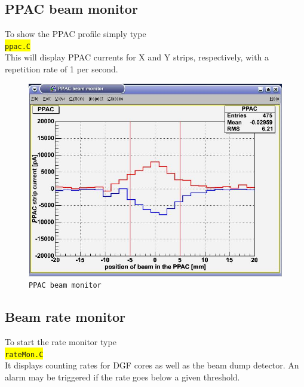 \documentclass[10pt]{article}
\newcommand{\yellow}[1]{\colorbox{yellow}{\texttt{#1}}}
\begin{document}
\subsection{PPAC beam monitor}\label{PPAC}\vspace{3mm}

To show the PPAC profile simply type\\

\hspace*{.2\linewidth}\yellow{ppac.C}\\

This will display PPAC currents for X and Y strips, respectively, with a repetition rate of 1 per second.

\begin{center}
\begin{figure}[H]
\centerline{\includegraphics[width=\linewidth]{PpacBeamMonitor}}
\caption{\texttt{PPAC beam monitor}}
\label{PpacBeamMonitor}
\end{figure}
\end{center}
\newpage
\subsection{Beam rate monitor}\label{RateMon}\vspace{3mm}

To start the rate monitor type\\

\hspace*{.2\linewidth}\yellow{rateMon.C}\\

It displays counting rates for DGF cores as well as the beam dump detector.
An alarm may be triggered if the rate goes below a given threshold.\\
\end{document}

